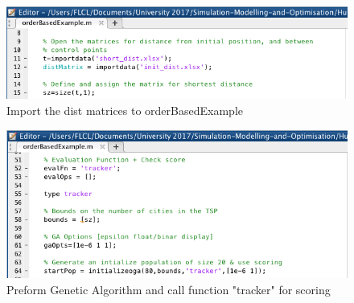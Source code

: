 \documentclass[a4paper, 10pt]{IEEEconf}
\begin{document}
\begin{figure}[H]
  \includegraphics[width=\linewidth, center]{images/import}
  \caption{Import the dist matrices to orderBasedExample}
  \label{fig:Import the dist matrices to orderBasedExample}
\end{figure}

\begin{figure}[H]
  \includegraphics[width=\linewidth, center]{images/scoring}
  \caption{Preform Genetic Algorithm and call function "tracker" for scoring}
  \label{fig:Preform Genetic Algorithm and call function "tracker" for scoring}
\end{figure}
\end{document}
